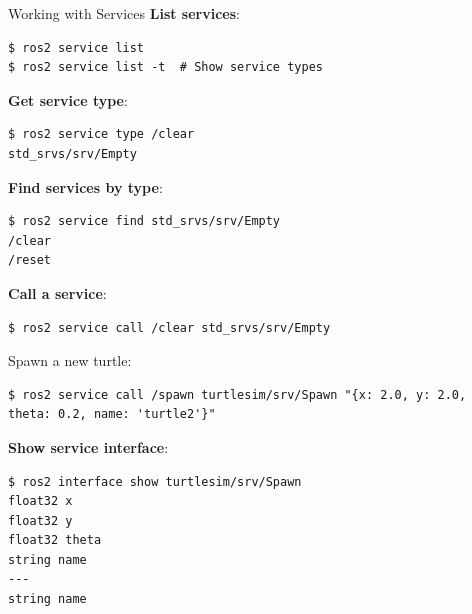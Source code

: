 \begin{frame}{Working with Services}
    \textbf{List services}:
    \begin{lstlisting}[language=shell]
$ ros2 service list
$ ros2 service list -t  # Show service types
\end{lstlisting}

    \textbf{Get service type}:
    \begin{lstlisting}[language=shell]
$ ros2 service type /clear
std_srvs/srv/Empty
\end{lstlisting}

    \textbf{Find services by type}:
    \begin{lstlisting}[language=shell]
$ ros2 service find std_srvs/srv/Empty
/clear
/reset
\end{lstlisting}

    \framebreak

    \textbf{Call a service}:
    \begin{lstlisting}[language=shell]
$ ros2 service call /clear std_srvs/srv/Empty
\end{lstlisting}

    Spawn a new turtle:
    \begin{lstlisting}[language=shell]
$ ros2 service call /spawn turtlesim/srv/Spawn "{x: 2.0, y: 2.0, theta: 0.2, name: 'turtle2'}"
\end{lstlisting}

    \textbf{Show service interface}:
    \begin{lstlisting}[language=shell]
$ ros2 interface show turtlesim/srv/Spawn
float32 x
float32 y
float32 theta
string name
---
string name
\end{lstlisting}
\end{frame}

